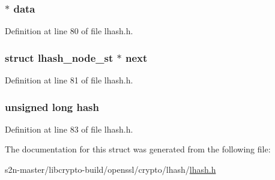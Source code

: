 \subsubsection[{\texorpdfstring{data}{data}}]{ $\ast$ data}\hypertarget{structlhash__node__st_ac5c5967f62e5c3601479be651a8ed76c}{}\label{structlhash__node__st_ac5c5967f62e5c3601479be651a8ed76c}


Definition at line 80 of file lhash.\+h.

\subsubsection[{\texorpdfstring{next}{next}}]{\setlength{\rightskip}{0pt plus 5cm}struct {\bf lhash\+\_\+node\+\_\+st} $\ast$ next}\hypertarget{structlhash__node__st_a7cf05b734aba8aebdd7a04cbd07b1dd6}{}\label{structlhash__node__st_a7cf05b734aba8aebdd7a04cbd07b1dd6}


Definition at line 81 of file lhash.\+h.

\subsubsection[{\texorpdfstring{hash}{hash}}]{\setlength{\rightskip}{0pt plus 5cm}unsigned long {\bf hash}}\hypertarget{structlhash__node__st_ad10fa3a6614e888a28138088e2623f58}{}\label{structlhash__node__st_ad10fa3a6614e888a28138088e2623f58}


Definition at line 83 of file lhash.\+h.



The documentation for this struct was generated from the following file\+:\begin{DoxyCompactItemize}
\item 
s2n-\/master/libcrypto-\/build/openssl/crypto/lhash/\hyperlink{crypto_2lhash_2lhash_8h}{lhash.\+h}\end{DoxyCompactItemize}
